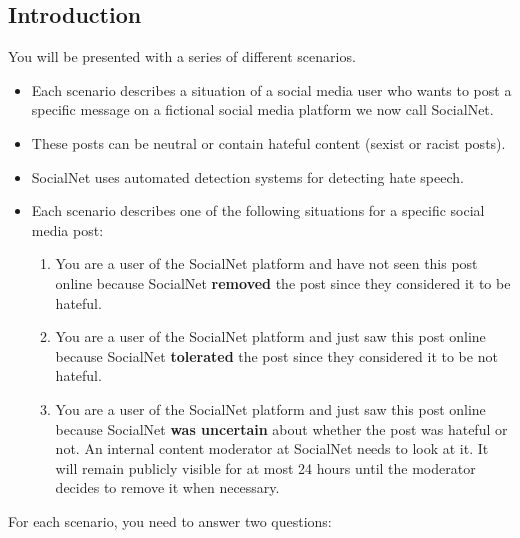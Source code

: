 \documentclass[a4paper]{article}
\begin{document}
\subsection{Introduction}
You will be presented with a series of different scenarios.
\begin{itemize}
    \item Each scenario describes a situation of a social media user who wants to post a specific message on a fictional social media platform we now call SocialNet.
    \item These posts can be neutral or contain hateful content (sexist or racist posts).
    \item SocialNet uses automated detection systems for detecting hate speech.
    \item Each scenario describes one of the following situations for a specific social media post:
          \begin{enumerate}
              \item You are a user of the SocialNet platform and have not seen this post online because SocialNet \textbf{removed} the post since they considered it to be hateful.
              \item You are a user of the SocialNet platform and just saw this post online because SocialNet \textbf{tolerated} the post since they considered it to be not hateful.
              \item You are a user of the SocialNet platform and just saw this post online because SocialNet \textbf{was uncertain} about whether the post was hateful or not. An internal content moderator at SocialNet needs to look at it. It will remain publicly visible for at most 24 hours until the moderator decides to remove it when necessary.
          \end{enumerate}
\end{itemize}

For each scenario, you need to answer two questions:
\end{document}
